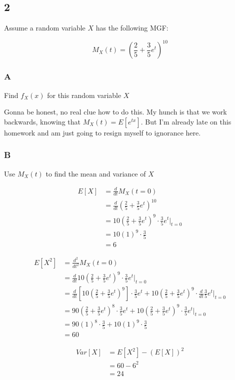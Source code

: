\subsection*{2}

Assume a random variable $X$ has the following MGF:

\[
	M_X(t) = \left( \frac{2}{5} + \frac{3}{5}e^t \right)^{10}
\]

\subsubsection*{A}

Find $f_X(x)$ for this random variable $X$

Gonna be honest, no real clue how to do this. My hunch is that we work backwards, knowing that $M_X(t) = E[e^{tx}]$. But I'm already late on this homework and am just going to resign myself to ignorance here.

\subsubsection*{B}

Use $M_X(t)$ to find the mean and variance of $X$

\begin{align*}
	E[X] &= \frac{d}{dt} M_X(t=0) \\
	&= \frac{d}{dt} \left( \frac{2}{5} + \frac{3}{5}e^t \right)^{10} \\
	&=  10\left( \frac{2}{5} + \frac{3}{5}e^t \right)^{9} \cdot \frac{3}{5}e^t \bigg\rvert_{t=0} \\
	&= 10(1)^9 \cdot \frac{3}{5} \\
	&= 6
\end{align*}

\begin{align*}
	E[X^2] &= \frac{d^2}{dt^2} M_X(t=0) \\
	&= \frac{d}{dt} 10\left( \frac{2}{5} + \frac{3}{5}e^t \right)^{9} \cdot \frac{3}{5}e^t \bigg\rvert_{t=0} \\
	&= \frac{d}{dt} \left[  10\left( \frac{2}{5} + \frac{3}{5}e^t \right)^{9} \right] \cdot \frac{3}{5}e^t 
	+  10\left( \frac{2}{5} + \frac{3}{5}e^t \right)^{9} \cdot \frac{d}{dt} \frac{3}{5} e^t \bigg\rvert_{t=0} \\
	&= 90\left( \frac{2}{5} + \frac{3}{5}e^t \right)^8 \cdot \frac{3}{5}e^t 
	+  10\left( \frac{2}{5} + \frac{3}{5}e^t \right)^{9} \cdot \frac{3}{5} e^t \bigg\rvert_{t=0} \\
	&= 90(1)^8 \cdot \frac{3}{5} + 10(1)^9 \cdot \frac{3}{5} \\
	&= 60
\end{align*}

\begin{align*}
	Var[X] &= E[X^2] - (E[X])^2 \\
	&= 60 - 6^2 \\
	&= 24
\end{align*}
